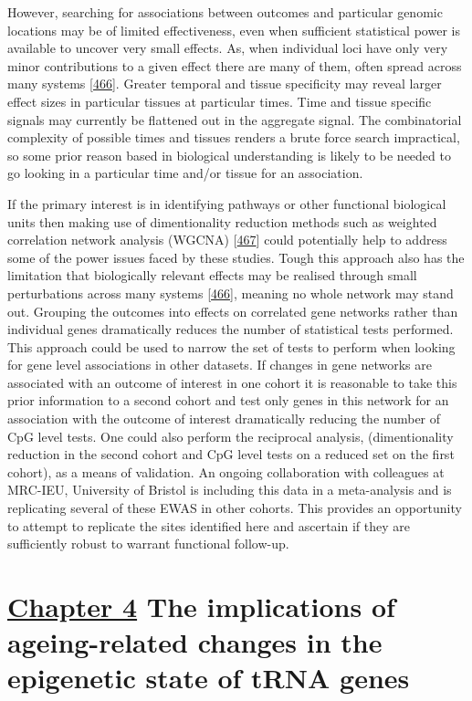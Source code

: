 \documentclass[
]{book}
\begin{document}
However, searching for associations between outcomes and particular genomic locations may be of limited effectiveness, even when sufficient statistical power is available to uncover very small effects.
As, when individual loci have only very minor contributions to a given effect there are many of them, often spread across many systems {[}\protect\hyperlink{ref-Boyle2017}{466}{]}.
Greater temporal and tissue specificity may reveal larger effect sizes in particular tissues at particular times.
Time and tissue specific signals may currently be flattened out in the aggregate signal.
The combinatorial complexity of possible times and tissues renders a brute force search impractical, so some prior reason based in biological understanding is likely to be needed to go looking in a particular time and/or tissue for an association.

If the primary interest is in identifying pathways or other functional biological units then making use of dimentionality reduction methods such as weighted correlation network analysis (WGCNA) {[}\protect\hyperlink{ref-Langfelder2008}{467}{]} could potentially help to address some of the power issues faced by these studies.
Tough this approach also has the limitation that biologically relevant effects may be realised through small perturbations across many systems {[}\protect\hyperlink{ref-Boyle2017}{466}{]}, meaning no whole network may stand out.
Grouping the outcomes into effects on correlated gene networks rather than individual genes dramatically reduces the number of statistical tests performed.
This approach could be used to narrow the set of tests to perform when looking for gene level associations in other datasets.
If changes in gene networks are associated with an outcome of interest in one cohort it is reasonable to take this prior information to a second cohort and test only genes in this network for an association with the outcome of interest dramatically reducing the number of CpG level tests.
One could also perform the reciprocal analysis, (dimentionality reduction in the second cohort and CpG level tests on a reduced set on the first cohort), as a means of validation.
An ongoing collaboration with colleagues at MRC-IEU, University of Bristol is including this data in a meta-analysis and is replicating several of these EWAS in other cohorts.
This provides an opportunity to attempt to replicate the sites identified here and ascertain if they are sufficiently robust to warrant functional follow-up.

\hypertarget{chapter-4-the-implications-of-ageing-related-changes-in-the-epigenetic-state-of-trna-genes}{%
\section{\texorpdfstring{\protect\hyperlink{tRNAs}{Chapter 4} The implications of ageing-related changes in the epigenetic state of tRNA genes}{Chapter 4 The implications of ageing-related changes in the epigenetic state of tRNA genes}}\label{chapter-4-the-implications-of-ageing-related-changes-in-the-epigenetic-state-of-trna-genes}}
\end{document}

